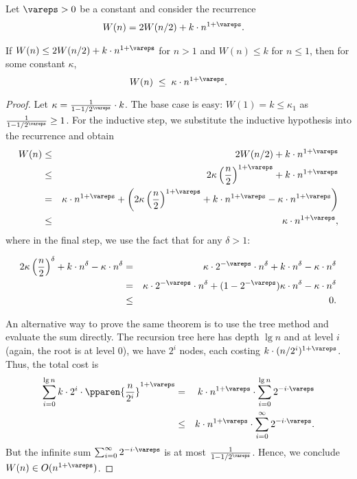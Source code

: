 \begin{flex}
\begin{theorem}
\label{thm:analysis::recurrences::linear-plus::copy}
Let $\vareps > 0$ be a
constant and consider  the recurrence
\begin{align*}
  W(n) & = 2W(n/2) + k\cdot n^{1+\vareps}.
\end{align*}

  If $W(n) \leq 2 W(n/2) + k \cdot n^{1+\vareps}$ for $n > 1$ and $W(n) \leq k$ for $n \leq
  1$, then for some constant $\kappa$, \[ W(n) \;\leq\;
  \kappa \cdot n^{1+\vareps}. \]
\end{theorem}

\begin{proof}
  Let $\kappa = \frac1{1-1/2^{\vareps}} \cdot k$. The base case is easy: $W(1) =
  k \leq \kappa_1$ as $\frac1{1 - 1/2^{\vareps}} \geq 1$.  For the inductive
  step, we substitute the inductive hypothesis into the recurrence and obtain
  \begin{eqnarray*}
    W(n) &\leq& 2W(n/2) + k \cdot n^{1+\vareps}\\
    &\leq& 2 \kappa\left(\frac{n}2 \right)^{1+\vareps} + k \cdot n^{1+\vareps}\\
    &=& \kappa \cdot n^{1+\vareps} + \left(2 \kappa\left(\frac{n}2 \right)^{1+\vareps} +
      k \cdot n^{1+\vareps} - \kappa \cdot n^{1+\vareps}\right)\\
    &\leq& \kappa \cdot n^{1+\vareps},
  \end{eqnarray*}
  where in the final step, we use the fact  that for any $\delta > 1$:

  \begin{eqnarray*}
    2 \kappa\left(\frac{n}2 \right)^{\delta} +
    k \cdot n^{\delta} - \kappa \cdot n^{\delta}
    &=& \kappa \cdot 2^{-\vareps} \cdot n^{\delta}  +
    k \cdot n^{\delta} - \kappa \cdot n^{\delta} \\
    &=& \kappa \cdot 2^{-\vareps} \cdot n^{\delta}  +
    (1 - 2^{-\vareps})\kappa\cdot n^{\delta} - \kappa \cdot n^{\delta} \\
    &\leq& 0.
  \end{eqnarray*}


An alternative way to prove the same theorem is to use the tree method
and evaluate the sum directly. The recursion tree here has depth $\lg
n$ and at level $i$ (again, the root is at level $0$), we have $2^i$
nodes, each costing $k\cdot (n/2^i)^{1+\vareps}$.  Thus, the total
cost is
  \begin{eqnarray*}
    \sum_{i=0}^{\lg n} k\cdot 2^i \cdot \pparen{\frac{n}{2^i}}^{1+\vareps}
    &=&  k\cdot n^{1+\vareps} \cdot \sum_{i=0}^{\lg n} 2^{-i\cdot\vareps} \\
    &\leq& k\cdot n^{1+\vareps} \cdot \sum_{i=0}^{\infty} 2^{-i\cdot\vareps}.
  \end{eqnarray*}
  But the infinite sum $\sum_{i=0}^{\infty} 2^{-i\cdot\vareps}$ is at most
  $\frac1{1 - 1/2^{\vareps}}$. Hence, we conclude $W(n) \in O(n^{1+\vareps})$.

\end{proof}
\end{flex}
